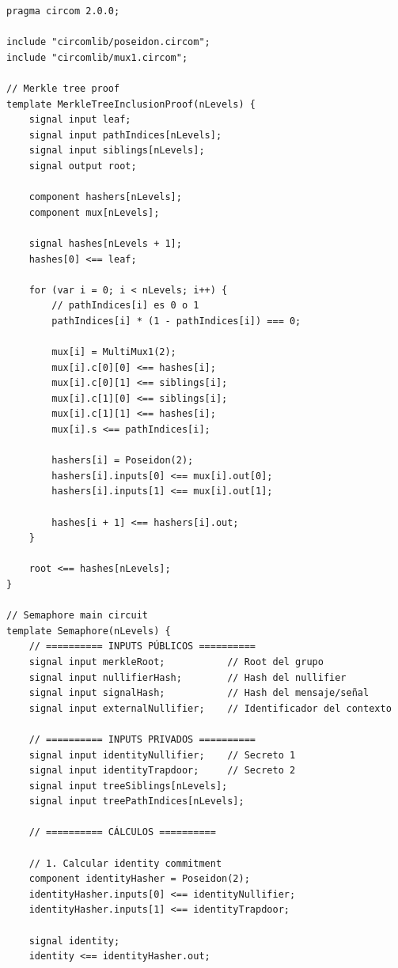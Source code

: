 \documentclass[11pt,a4paper,twoside]{book}
\theoremstyle{definition}
\theoremstyle{remark}
\begin{document}
\begin{lstlisting}[language=circom, caption={Circuito Semaphore simplificado}]
pragma circom 2.0.0;

include "circomlib/poseidon.circom";
include "circomlib/mux1.circom";

// Merkle tree proof
template MerkleTreeInclusionProof(nLevels) {
    signal input leaf;
    signal input pathIndices[nLevels];
    signal input siblings[nLevels];
    signal output root;
    
    component hashers[nLevels];
    component mux[nLevels];
    
    signal hashes[nLevels + 1];
    hashes[0] <== leaf;
    
    for (var i = 0; i < nLevels; i++) {
        // pathIndices[i] es 0 o 1
        pathIndices[i] * (1 - pathIndices[i]) === 0;
        
        mux[i] = MultiMux1(2);
        mux[i].c[0][0] <== hashes[i];
        mux[i].c[0][1] <== siblings[i];
        mux[i].c[1][0] <== siblings[i];
        mux[i].c[1][1] <== hashes[i];
        mux[i].s <== pathIndices[i];
        
        hashers[i] = Poseidon(2);
        hashers[i].inputs[0] <== mux[i].out[0];
        hashers[i].inputs[1] <== mux[i].out[1];
        
        hashes[i + 1] <== hashers[i].out;
    }
    
    root <== hashes[nLevels];
}

// Semaphore main circuit
template Semaphore(nLevels) {
    // ========== INPUTS PÚBLICOS ==========
    signal input merkleRoot;           // Root del grupo
    signal input nullifierHash;        // Hash del nullifier
    signal input signalHash;           // Hash del mensaje/señal
    signal input externalNullifier;    // Identificador del contexto
    
    // ========== INPUTS PRIVADOS ==========
    signal input identityNullifier;    // Secreto 1
    signal input identityTrapdoor;     // Secreto 2
    signal input treeSiblings[nLevels];
    signal input treePathIndices[nLevels];
    
    // ========== CÁLCULOS ==========
    
    // 1. Calcular identity commitment
    component identityHasher = Poseidon(2);
    identityHasher.inputs[0] <== identityNullifier;
    identityHasher.inputs[1] <== identityTrapdoor;
    
    signal identity;
    identity <== identityHasher.out;
    

\end{lstlisting}
\end{document}
